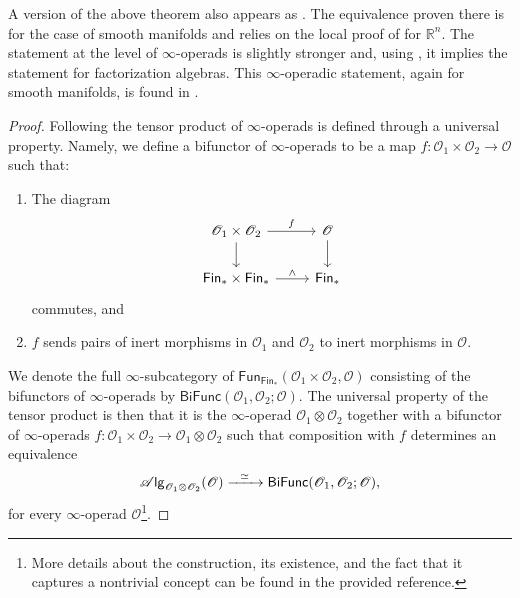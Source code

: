 \documentclass[../text.tex]{subfiles}
\begin{document}
\begin{remark}
    A version of the above theorem also appears as \cite[prop.18]{ginot2015}. The equivalence proven there is for the case of smooth manifolds and relies on the local proof of \cite{lurie_ha} for $\mathbb{R}^n$. The statement at the level of $\infty$-operads is slightly stronger and, using , it implies the statement for factorization algebras. This $\infty$-operadic statement, again for smooth manifolds, is found in \cite[ex.5.4.5.5]{lurie_ha}.
\end{remark}


\begin{proof}
    Following \cite[\S.2.2.5]{lurie_ha} the tensor product of $\infty$-operads is defined through a universal property. Namely, we define a bifunctor of $\infty$-operads to be a map $f: \mathscr{O}_1 \times \mathscr{O}_2 \xrightarrow{} \mathscr{O}$ such that:
    \begin{enumerate}
        \item The diagram
        \begin{equation}
            \begin{tikzcd}
                \mathscr{O}_1 \times \mathscr{O}_2 \arrow[r, "f"] \arrow[d] & \mathscr{O} \arrow[d] \\
                \mathsf{Fin}_* \times \mathsf{Fin}_* \arrow[r, "\wedge"] & \mathsf{Fin}_*
            \end{tikzcd}
        \end{equation}
        commutes, and
        \item $f$ sends pairs of inert morphisms in $\mathscr{O}_1$ and $\mathscr{O}_2$ to inert morphisms in $\mathscr{O}$.
    \end{enumerate}
    We denote the full $\infty$-subcategory of $\mathsf{Fun}_{\mathsf{Fin}_*}(\mathscr{O}_1 \times \mathscr{O}_2, \mathscr{O})$ consisting of the bifunctors of $\infty$-operads by $\mathsf{BiFunc}(\mathscr{O}_1, \mathscr{O}_2; \mathscr{O})$. The universal property of the tensor product is then that it is the $\infty$-operad $\mathscr{O}_1 \otimes \mathscr{O}_2$ together with a bifunctor of $\infty$-operads $f: \mathscr{O}_1 \times \mathscr{O}_2 \xrightarrow{} \mathscr{O}_1 \otimes \mathscr{O}_2$ such that composition with $f$ determines an equivalence
    \begin{equation}
        \mathscr{A} \mathsf{lg}_{\mathscr{O}_1 \otimes \mathscr{O}_2} (\mathscr{O}) \xrightarrow{\ \ \simeq \ \ } \mathsf{BiFunc}(\mathscr{O}_1, \mathscr{O}_2; \mathscr{O}),
    \end{equation}
    for every $\infty$-operad $\mathscr{O}$\footnote{More details about the construction, its existence, and the fact that it captures a nontrivial concept can be found in the provided reference.}.


\end{proof}
\end{document}
